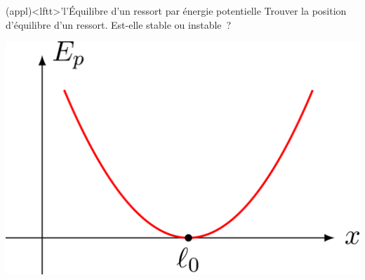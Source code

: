 \documentclass[../../main/main.tex]{subfiles}
\begin{document}
\begin{tcb*}(appl)<lftt>'l'{Équilibre d'un ressort par énergie potentielle}
	Trouver la position d'équilibre d'un ressort. Est-elle stable ou instable~?
	\tcblower
	\begin{minipage}{0.25\linewidth}
		\begin{center}
			\includegraphics[width=\linewidth]{stab_ressort}
		\end{center}
	\end{minipage}
	\hfill
	\begin{minipage}{0.70\linewidth}
		\vspace{-15pt}
	\end{minipage}
\end{tcb*}
\end{document}
